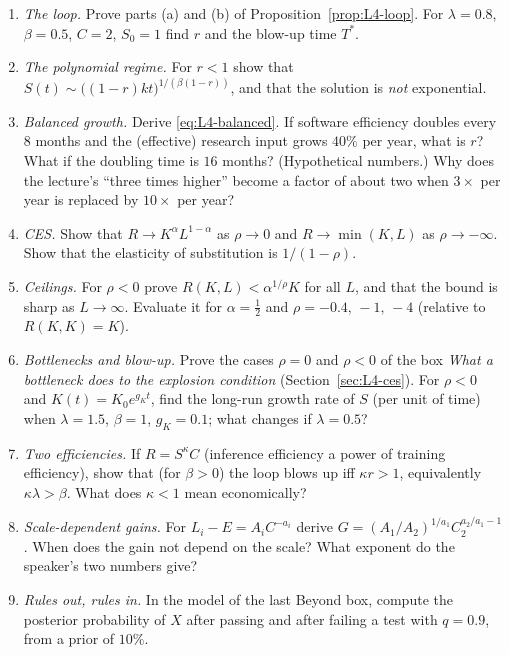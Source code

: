 \begin{exercise}[Problems]
\begin{enumerate}
  \item \emph{The loop.} Prove parts (a) and (b) of Proposition~\ref{prop:L4-loop}. For $\lambda=0.8$, $\beta=0.5$, $C=2$, $S_0=1$ find $r$ and the blow-up time $T^*$.
  \item \emph{The polynomial regime.} For $r<1$ show that $S(t)\sim\big((1-r)kt\big)^{1/(\beta(1-r))}$, and that the solution is \emph{not} exponential.
  \item \emph{Balanced growth.} Derive \eqref{eq:L4-balanced}. If software efficiency doubles every $8$ months and the (effective) research input grows $40\%$ per year, what is $r$? What if the doubling time is $16$ months? (Hypothetical numbers.) Why does the lecture's ``three times higher'' become a factor of about two when $3\times$ per year is replaced by $10\times$ per year?
  \item \emph{CES.} Show that $R\to K^{\alpha}L^{1-\alpha}$ as $\rho\to0$ and $R\to\min(K,L)$ as $\rho\to-\infty$. Show that the elasticity of substitution is $1/(1-\rho)$.
  \item \emph{Ceilings.} For $\rho<0$ prove $R(K,L)<\alpha^{1/\rho}K$ for all $L$, and that the bound is sharp as $L\to\infty$. Evaluate it for $\alpha=\frac12$ and $\rho=-0.4,\,-1,\,-4$ (relative to $R(K,K)=K$).
  \item \emph{Bottlenecks and blow-up.} Prove the cases $\rho=0$ and $\rho<0$ of the box \emph{What a bottleneck does to the explosion condition} (Section~\ref{sec:L4-ces}). For $\rho<0$ and $K(t)=K_0e^{g_Kt}$, find the long-run growth rate of $S$ (per unit of time) when $\lambda=1.5$, $\beta=1$, $g_K=0.1$; what changes if $\lambda=0.5$?
  \item \emph{Two efficiencies.} If $R=S^\kappa C$ (inference efficiency a power of training efficiency), show that (for $\beta>0$) the loop blows up iff $\kappa r>1$, equivalently $\kappa\lambda>\beta$. What does $\kappa<1$ mean economically?
  \item \emph{Scale-dependent gains.} For $L_i-E=A_iC^{-a_i}$ derive $G=(A_1/A_2)^{1/a_1}C_2^{a_2/a_1-1}$. When does the gain not depend on the scale? What exponent do the speaker's two numbers give?
  \item \emph{Rules out, rules in.} In the model of the last Beyond box, compute the posterior probability of $X$ after passing and after failing a test with $q=0.9$, from a prior of $10\%$.
\end{enumerate}
\end{exercise}
